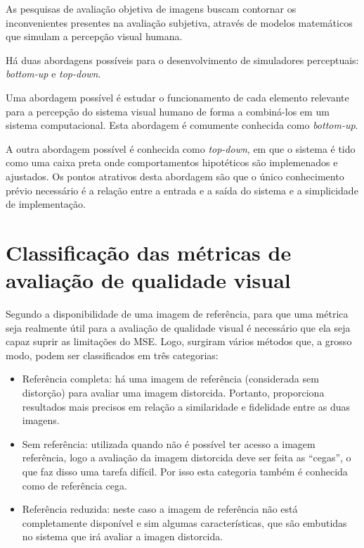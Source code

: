 As pesquisas de avaliação objetiva de imagens buscam contornar os inconvenientes presentes na avaliação subjetiva, através de modelos matemáticos que simulam a percepção visual humana.

Há duas abordagens possíveis para o desenvolvimento de simuladores perceptuais: \textit{bottom-up} e \textit{top-down}.

Uma abordagem possível é estudar o funcionamento de cada elemento relevante para a percepção do sistema visual humano de forma a combiná-los em um sistema computacional. Esta abordagem é comumente conhecida como \textit{bottom-up}.

A outra abordagem possível é conhecida como \textit{top-down}, em que  o sistema é tido como uma caixa preta onde comportamentos hipotéticos são implemenados e ajustados. Os pontos atrativos desta abordagem são que o único conhecimento prévio necessário é a relação entre a entrada e a saída do sistema e a simplicidade de implementação.

\section{Classificação das métricas de avaliação de qualidade visual}
\label{metri_obj}

Segundo a disponibilidade de uma imagem de referência, para que uma métrica seja realmente útil para a avaliação de qualidade visual é necessário que ela seja capaz suprir as limitações do MSE. Logo, surgiram vários métodos que, a grosso modo, podem ser classificados em três categorias:

\begin{itemize}
\item Referência completa: há uma imagem de referência (considerada sem distorção) para avaliar uma imagem distorcida. Portanto, proporciona resultados mais precisos em relação a similaridade e fidelidade entre as duas imagens.
\item Sem referência: utilizada quando não é possível ter acesso a imagem referência, logo a avaliação da imagem distorcida deve ser feita as ``cegas'', o que faz disso uma tarefa difícil. Por isso esta categoria também é conhecida como de referência cega.
\item Referência reduzida: neste caso a imagem de referência não está completamente disponível e sim algumas características, que são embutidas no sistema que irá avaliar a imagen distorcida.
\end{itemize}

